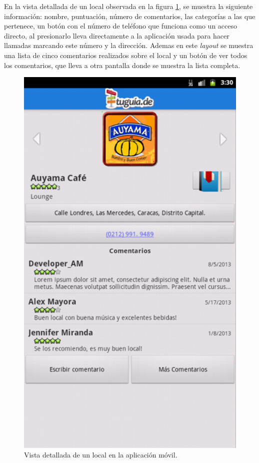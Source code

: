 En la vista detallada de un local observada en la figura \ref{fig:detalle_local}, se muestra la siguiente información: nombre, puntuación, número de comentarios, las categorías a las que pertenece, un botón con el número de teléfono que funciona como un acceso directo, al presionarlo lleva directamente a la aplicación usada para hacer llamadas marcando este número y la dirección. Ademas en este \textit{layout} se muestra una lista de cinco comentarios realizados sobre el local y un botón de ver todos los comentarios, que lleva a otra pantalla donde se muestra la lista completa.
\begin{figure}[h]
	\begin{center}
		\includegraphics[scale=0.5]{imagenes/detalle.png}
	\end{center}
	\caption{
		\label{fig:detalle_local}
		Vista detallada de un local en la aplicación móvil.
	}
\end{figure}
\\

